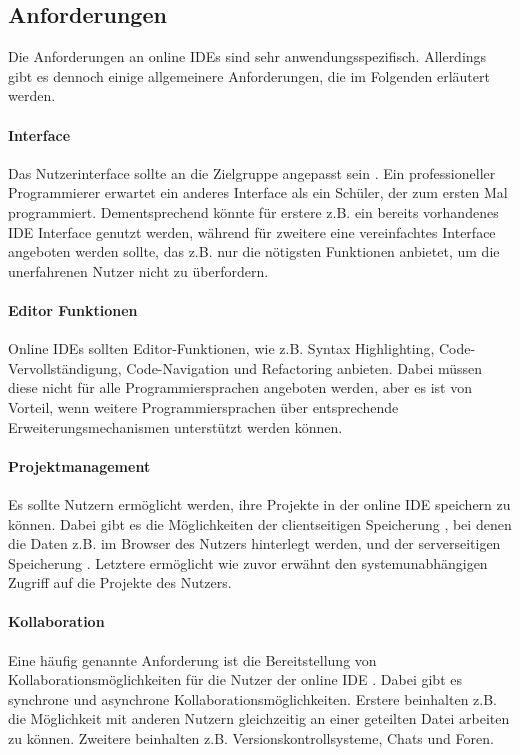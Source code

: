 \subsection{Anforderungen}\label{section:stand-der-technik:literaturrecherche:anforderungen}

Die Anforderungen an online IDEs sind sehr anwendungsspezifisch. Allerdings gibt es dennoch einige allgemeinere Anforderungen, die im Folgenden erläutert werden.

\paragraph{Interface}
Das Nutzerinterface sollte an die Zielgruppe angepasst sein \cite{malan_standardizing_2022}. Ein professioneller Programmierer erwartet ein anderes Interface als ein Schüler, der zum ersten Mal programmiert. Dementsprechend könnte für erstere z.B. ein bereits vorhandenes IDE Interface genutzt werden, während für zweitere eine vereinfachtes Interface angeboten werden sollte, das z.B. nur die nötigsten Funktionen anbietet, um die unerfahrenen Nutzer nicht zu überfordern.

\paragraph{Editor Funktionen}
Online IDEs sollten Editor-Funktionen, wie z.B. Syntax Highlighting, Code-Vervollständigung, Code-Navigation und Refactoring anbieten. Dabei müssen diese nicht für alle Programmiersprachen angeboten werden, aber es ist von Vorteil, wenn weitere Programmiersprachen über entsprechende Erweiterungsmechanismen unterstützt werden können.

\paragraph{Projektmanagement}
Es sollte Nutzern ermöglicht werden, ihre Projekte in der online IDE speichern zu können. Dabei gibt es die Möglichkeiten der clientseitigen Speicherung \cite{jefferson_pyodideu_2024}, bei denen die Daten z.B. im Browser des Nutzers hinterlegt werden, und der serverseitigen Speicherung \cite{ball_beyond_2015}. Letztere ermöglicht wie zuvor erwähnt den systemunabhängigen Zugriff auf die Projekte des Nutzers.

\paragraph{Kollaboration}
Eine häufig genannte Anforderung ist die Bereitstellung von Kollaborationsmöglichkeiten für die Nutzer der online IDE \cite{goldman_real-time_2011}\cite{ghorashi_jimbo_2016}\cite{warner_codepilot_2017}. Dabei gibt es synchrone und asynchrone Kollaborationsmöglichkeiten. Erstere beinhalten z.B. die Möglichkeit mit anderen Nutzern gleichzeitig an einer geteilten Datei arbeiten zu können. Zweitere beinhalten z.B. Versionskontrollsysteme, Chats und Foren.


